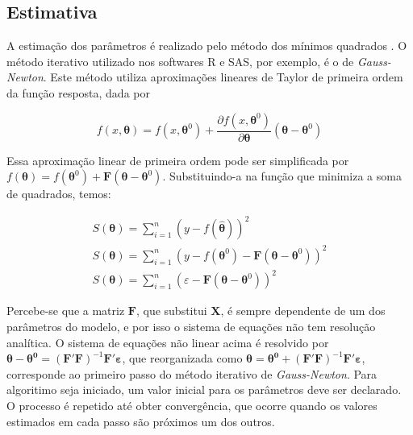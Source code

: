 \documentclass[
]{book}
\begin{document}
\hypertarget{estimativa-1}{%
\subsection{Estimativa}\label{estimativa-1}}

A estimação dos parâmetros é realizado pelo método dos mínimos quadrados . O método iterativo utilizado nos softwares R e SAS, por exemplo, é o de \emph{Gauss-Newton}. Este método utiliza aproximações lineares de Taylor de primeira ordem da função resposta, dada por

\[
f\left( {x,{\boldsymbol{\theta }}} \right) = f\left( {x,{{\boldsymbol{\theta }}^0}} \right) + \frac{{\partial f\left( {x,{{\boldsymbol{\theta }}^0}} \right)}}{{\partial {\boldsymbol{\theta }}}}\left( {{\boldsymbol{\theta }} - {{\boldsymbol{\theta }}^0}} \right)	
\]

Essa aproximação linear de primeira ordem pode ser simplificada por \(f\left( {\boldsymbol{\theta }} \right) = f\left( {{{\boldsymbol{\theta }}^0}} \right) + {\boldsymbol{F}}\left( {{\boldsymbol{\theta }} - {{\boldsymbol{\theta }}^0}} \right)\). Substituindo-a na função que minimiza a soma de quadrados, temos:

\[
\begin{array}{c}S\left( {\boldsymbol{\theta }} \right) = \sum\limits_{i = 1}^n {{{\left( {y - f\left( {{\boldsymbol{\hat \theta }}} \right)} \right)}^2}} \\S\left( {\boldsymbol{\theta }} \right) = \sum\limits_{i = 1}^n {{{\left( {y - f\left( {{{\boldsymbol{\theta }}^0}} \right) - {\boldsymbol{F}}\left( {{\boldsymbol{\theta }} - {{\boldsymbol{\theta }}^0}} \right)} \right)}^2}} \\S\left( {\boldsymbol{\theta }} \right) = \sum\limits_{i = 1}^n {{{\left( {\varepsilon  - {\boldsymbol{F}}\left( {{\boldsymbol{\theta }} - {{\boldsymbol{\theta }}^0}} \right)} \right)}^2}} \end{array}
\]

Percebe-se que a matriz \(\boldsymbol{F}\), que substitui \(\boldsymbol{X}\), é sempre dependente de um dos parâmetros do modelo, e por isso o sistema de equações não tem resolução analítica. O sistema de equações não linear acima é resolvido por \({\boldsymbol{\theta }} - {{\boldsymbol{\theta }}^{\boldsymbol{0}}} = {\left( {{\boldsymbol{F}}'{\boldsymbol{F}}} \right)^{ - 1}}{\boldsymbol{F}}'{\boldsymbol{\varepsilon }}\), que reorganizada como \({\boldsymbol{\theta }} = {{\boldsymbol{\theta }}^{\boldsymbol{0}}} + {\left( {{\boldsymbol{F}}'{\boldsymbol{F}}} \right)^{ - 1}}{\boldsymbol{F}}'{\boldsymbol{\varepsilon }}\), corresponde ao primeiro passo do método iterativo de \emph{Gauss-Newton}. Para algoritimo seja iniciado, um valor inicial para os parâmetros deve ser declarado. O processo é repetido até obter convergência, que ocorre quando os valores estimados em cada passo são próximos um dos outros.
\end{document}

